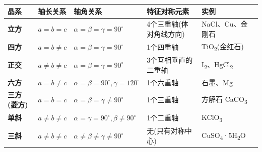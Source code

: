 \documentclass[a4paper,11pt]{ctexart}
\newcounter{none}
\newcommand{\箭}{\ensuremath{\rightarrow}}
\newcommand{\左箭}{\ensuremath{\leftarrow}}
\newcommand{\上箭}{\ensuremath{\uparrow}}
\newcommand{\下箭}{\ensuremath{\downarrow}}
\newcommand{\衡}{\ensuremath{\rightleftharpoons}}
\newcommand{\双箭}{\ensuremath{\leftrightarrow}}
\newcommand{\约等于}{\ensuremath{\approx}}
\newcommand{\小于等于}{\ensuremath{\leq}}
\newcommand{\大于等于}{\ensuremath{\geq}}
\newcommand{\不等于}{\ensuremath{\neq}}
\newcommand{\西格马}{\ensuremath{\sigma}}
\newcommand{\派}{\ensuremath{\pi}}
\begin{document}
{\def\LTcaptype{none} %
\begin{longtable}[]{@{}
  >{\raggedright\arraybackslash}p{}
  >{\raggedright\arraybackslash}p{}
  >{\raggedright\arraybackslash}p{}
  >{\raggedright\arraybackslash}p{}
  >{\raggedright\arraybackslash}p{}@{}}
\toprule\noalign{}
\begin{minipage}[b]{\linewidth}\raggedright
晶系
\end{minipage} & \begin{minipage}[b]{\linewidth}\raggedright
轴长关系
\end{minipage} & \begin{minipage}[b]{\linewidth}\raggedright
轴角关系
\end{minipage} & \begin{minipage}[b]{\linewidth}\raggedright
特征对称元素
\end{minipage} & \begin{minipage}[b]{\linewidth}\raggedright
实例
\end{minipage} \\
\midrule\noalign{}
\endhead
\bottomrule\noalign{}
\endlastfoot
\textbf{立方} & \(a = b = c\) & \(\alpha = \beta = \gamma = 90^\circ\) & 4个三重轴(体对角线方向) & NaCl、Cu、金刚石 \\
\textbf{四方} & \(a = b \neq c\) & \(\alpha = \beta = \gamma = 90^\circ\) & 1个四重轴 & TiO\textsubscript{2}(金红石) \\
\textbf{正交} & \(a \neq b \neq c\) & \(\alpha = \beta = \gamma = 90^\circ\) & 3个互相垂直的二重轴 & I\textsubscript{2}、HgCl\textsubscript{2} \\
\textbf{六方} & \(a = b \neq c\) & \(\alpha = \beta = 90^\circ, \gamma = 120^\circ\) & 1个六重轴 & 石墨、Mg \\
\textbf{三方(菱方)} & \(a = b = c\) & \(\alpha = \beta = \gamma \neq 90^\circ\) & 1个三重轴 & 方解石 CaCO\textsubscript{3} \\
\textbf{单斜} & \(a \neq b \neq c\) & \(\alpha = \gamma = 90^\circ, \beta \neq 90^\circ\) & 1个二重轴 & KClO\textsubscript{3} \\
\textbf{三斜} & \(a \neq b \neq c\) & \(\alpha \neq \beta \neq \gamma \neq 90^\circ\) & 无(只有对称中心) & CuSO\textsubscript{4}·5H\textsubscript{2}O \\
\end{longtable}
}
\end{document}
